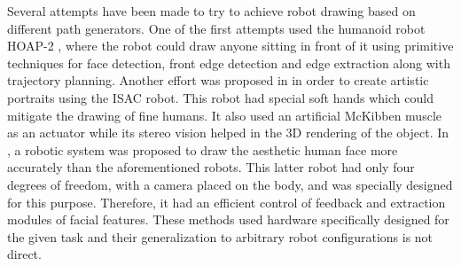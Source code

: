 \documentclass[conference]{IEEEtran}
\begin{document}
Several attempts have been made to try to achieve robot drawing based on
different path generators.
One of the first attempts used the humanoid robot HOAP-2 \cite{ref3}, where the robot could draw anyone sitting in front of it using primitive techniques for face detection, front edge detection and edge extraction along with trajectory planning. Another effort was proposed in \cite{ref4} in order to create artistic portraits using the ISAC robot. This robot had special soft hands which could mitigate the drawing of fine humans. It also used an artificial McKibben muscle as an actuator while its stereo vision helped in the 3D rendering of the object. In \cite{ref5}, a robotic system was proposed to draw the aesthetic human face more accurately than the aforementioned robots. This latter robot had only four degrees of freedom, with a camera placed on the body, and was specially designed for this purpose. Therefore, it had an efficient control of feedback and extraction modules of facial features. These methods used hardware specifically designed for the given task and their generalization to arbitrary robot configurations is not direct.



\end{document}
